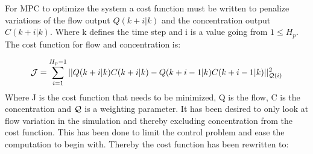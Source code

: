 
For MPC to optimize the system a cost function must be written to penalize variations of the flow output $Q(k+i|k)$ and the concentration output $C(k+i|k)$. Where k defines the time step and i is a value going from $1\leq H_p$. The cost function for flow and concentration is:

\begin{equation}
	 \CMcal{J} = \sum_{i=1}^{H_p-1} || Q(k+i|k)C(k+i|k)-Q(k+i-1|k)C(k+i-1|k)||_{\CMcal{Q}(i)}^2
\end{equation}
Where J is the cost function that needs to be minimized, Q is the flow, C is the concentration and $\CMcal{Q}$ is a weighting parameter. It has been desired to only look at flow variation in the simulation and thereby excluding concentration from the cost function. This has been done to limit the control problem and ease the computation to begin with. Thereby the cost function has been rewritten to: 

